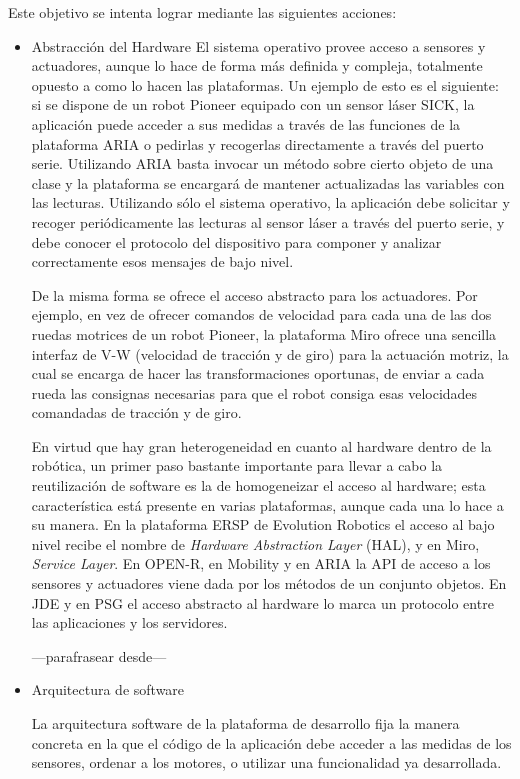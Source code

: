 Este objetivo se intenta lograr mediante las siguientes acciones:

\begin{itemize}
	\itemsep1pt \parskip1pt 
	\item Abstracción del Hardware
	El sistema operativo provee acceso a sensores y actuadores, aunque lo hace de forma más definida y compleja, totalmente opuesto a como lo hacen las plataformas. Un ejemplo de esto es el siguiente: si se dispone de un robot Pioneer equipado con un sensor láser SICK, la aplicación puede acceder a sus medidas a través de las funciones de la plataforma ARIA o pedirlas y recogerlas directamente a través del puerto serie. Utilizando ARIA basta invocar un método sobre cierto objeto de una clase y la plataforma se encargará de mantener actualizadas las variables con las lecturas. Utilizando sólo el sistema operativo, la aplicación debe solicitar y recoger periódicamente las lecturas al sensor láser a través del puerto serie, y debe conocer el protocolo del dispositivo para componer y analizar correctamente esos mensajes de bajo nivel.

	De la misma forma se ofrece el acceso abstracto para los actuadores. Por ejemplo, en vez de ofrecer comandos de velocidad para cada una de las dos ruedas motrices de un robot Pioneer, la plataforma Miro ofrece una sencilla interfaz de V-W (velocidad de tracción y de giro) para la actuación motriz, la cual se encarga de hacer las transformaciones oportunas, de enviar a cada rueda las consignas necesarias para que el robot consiga esas velocidades comandadas de tracción y de giro.

	En virtud que hay gran heterogeneidad en cuanto al hardware dentro de la robótica, un primer paso bastante importante para llevar a cabo la reutilización de software es la de homogeneizar el acceso al hardware; esta característica está presente en varias plataformas, aunque cada una lo hace a su manera. En la plataforma ERSP de Evolution Robotics el acceso al bajo nivel recibe el nombre de \textit{Hardware Abstraction Layer} (HAL), y en Miro, \textit{Service Layer}. En OPEN-R, en Mobility y en ARIA la API de acceso a los sensores y actuadores viene dada por los métodos de un conjunto objetos. En JDE y en PSG el acceso abstracto al hardware lo marca un protocolo entre las aplicaciones y los servidores.

---parafrasear desde---
	\item Arquitectura de software

	La arquitectura software de la plataforma de desarrollo fija la manera concreta en la que el código de la aplicación debe acceder a las medidas de los sensores, ordenar a los motores, o utilizar una funcionalidad ya desarrollada.


\end{itemize}
